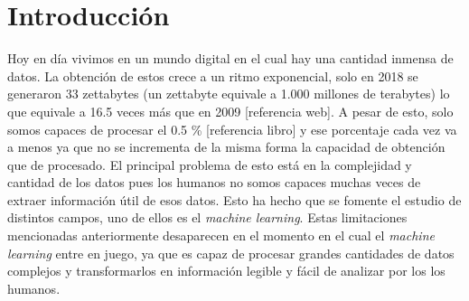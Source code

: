 \documentclass[a4paper, 12pt]{book}
\begin{document}


\tableofcontents 
\cleardoublepage
\listoffigures %



\cleardoublepage
\chapter{Introducción}
\label{sec:intro} %

Hoy en día vivimos en un mundo digital en el cual hay una cantidad inmensa de datos. La obtención de estos crece a un ritmo exponencial, solo en 2018 se generaron 33 zettabytes (un zettabyte equivale a 1.000 millones de terabytes) lo que equivale a 16.5 veces más que en 2009 [referencia web]. A pesar de esto, solo somos capaces de procesar el 0.5 \% [referencia libro] y ese porcentaje cada vez va a menos ya que no se incrementa de la misma forma la capacidad de obtención que de procesado. El principal problema de esto está en la complejidad y cantidad de los datos pues los humanos no somos capaces muchas veces de extraer información útil de esos datos. Esto ha hecho que se fomente el estudio de distintos campos, uno de ellos es el \emph{machine learning}. Estas limitaciones mencionadas anteriormente desaparecen en el momento en el cual el \emph{machine learning} entre en juego, ya que es capaz de procesar grandes cantidades de datos complejos y transformarlos en información legible y fácil de analizar por los los humanos.
\end{document}
